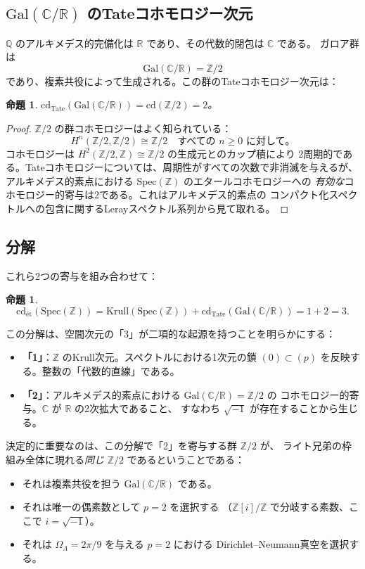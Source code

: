\documentclass[12pt,a4paper]{article}
\newtheorem{proposition}[theorem]{命題}
\theoremstyle{definition}
\newcommand{\Spec}{\mathrm{Spec}}
\newcommand{\Gal}{\mathrm{Gal}}
\newcommand{\cd}{\mathrm{cd}}
\newcommand{\Krull}{\mathrm{Krull}}
\newcommand{\ZZ}{\mathbb{Z}}
\newcommand{\QQ}{\mathbb{Q}}
\newcommand{\RR}{\mathbb{R}}
\newcommand{\CC}{\mathbb{C}}
\begin{document}
\subsection{$\Gal(\CC/\RR)$ のTateコホモロジー次元}

$\QQ$ のアルキメデス的完備化は $\RR$ であり、その代数的閉包は $\CC$ である。
ガロア群は
\[
  \Gal(\CC/\RR) = \ZZ/2
\]
であり、複素共役によって生成される。この群のTateコホモロジー次元は：

\begin{proposition}\label{prop:tate}
$\cd_{\mathrm{Tate}}(\Gal(\CC/\RR)) = \cd(\ZZ/2) = 2$。
\end{proposition}

\begin{proof}
$\ZZ/2$ の群コホモロジーはよく知られている：
\[
  H^n(\ZZ/2, \ZZ/2) \cong \ZZ/2 \quad \text{すべての } n \geq 0 \text{ に対して}。
\]
コホモロジーは $H^2(\ZZ/2, \ZZ) \cong \ZZ/2$ の生成元とのカップ積により
2周期的である。Tateコホモロジーについては、周期性がすべての次数で非消滅を与えるが、
アルキメデス的素点における $\Spec(\ZZ)$ のエタールコホモロジーへの
\emph{有効な}コホモロジー的寄与は2である。これはアルキメデス的素点の
コンパクト化スペクトルへの包含に関するLerayスペクトル系列から見て取れる。
\end{proof}

\subsection{分解}

これら2つの寄与を組み合わせて：

\begin{proposition}\label{prop:decomposition}
\[
  \cd_{\text{\'et}}(\Spec(\ZZ)) = \Krull(\Spec(\ZZ)) + \cd_{\mathrm{Tate}}(\Gal(\CC/\RR))
  = 1 + 2 = 3.
\]
\end{proposition}

この分解は、空間次元の「3」が二項的な起源を持つことを明らかにする：
\begin{itemize}
  \item \textbf{「1」}：$\ZZ$ のKrull次元。スペクトルにおける1次元の鎖
    $(0) \subset (p)$ を反映する。整数の「代数的直線」である。
  \item \textbf{「2」}：アルキメデス的素点における $\Gal(\CC/\RR) = \ZZ/2$ の
    コホモロジー的寄与。$\CC$ が $\RR$ の2次拡大であること、
    すなわち $\sqrt{-1}$ が存在することから生じる。
\end{itemize}

決定的に重要なのは、この分解で「2」を寄与する群 $\ZZ/2$ が、
ライト兄弟の枠組み全体に現れる\emph{同じ} $\ZZ/2$ であるということである：
\begin{itemize}
  \item それは複素共役を担う $\Gal(\CC/\RR)$ である。
  \item それは唯一の偶素数として $p=2$ を選択する
    （$\ZZ[i]/\ZZ$ で分岐する素数、ここで $i = \sqrt{-1}$）。
  \item それは $\Omega_\Lambda = 2\pi/9$ を与える $p=2$ における
    Dirichlet--Neumann真空を選択する。
\end{itemize}
\end{document}

